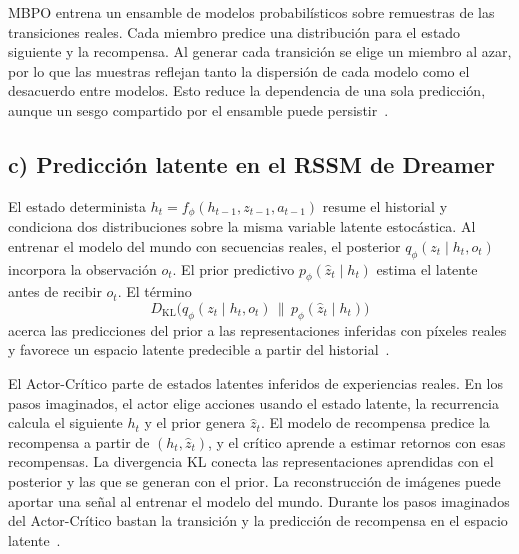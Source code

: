 MBPO entrena un ensamble de modelos probabilísticos sobre remuestras de
las transiciones reales. Cada miembro predice una distribución para el
estado siguiente y la recompensa. Al generar cada transición se elige
un miembro al azar, por lo que las muestras reflejan tanto la dispersión
de cada modelo como el desacuerdo entre modelos. Esto reduce la
dependencia de una sola predicción, aunque un sesgo compartido por el
ensamble puede persistir~\cite[secc.~5]{janner2019}.

\subsection*{c) Predicción latente en el RSSM de Dreamer}

El estado determinista $h_t=f_\phi(h_{t-1},z_{t-1},a_{t-1})$ resume el
historial y condiciona dos distribuciones sobre la misma variable
latente estocástica. Al entrenar el modelo del mundo con secuencias
reales, el posterior $q_\phi(z_t\mid h_t,o_t)$ incorpora la observación
$o_t$. El prior predictivo $p_\phi(\hat z_t\mid h_t)$ estima el latente
antes de recibir $o_t$. El término
\[
    D_{\mathrm{KL}}\bigl(
        q_\phi(z_t\mid h_t,o_t)\,\|\,p_\phi(\hat z_t\mid h_t)
    \bigr)
\]
acerca las predicciones del prior a las representaciones inferidas con
píxeles reales y favorece un espacio latente predecible a partir del
historial~\cite[secc.~4]{hafner2020}.

El Actor-Crítico parte de estados latentes inferidos de experiencias
reales. En los pasos imaginados, el actor elige acciones usando el
estado latente, la recurrencia calcula el siguiente $h_t$ y el prior
genera $\hat z_t$. El modelo de recompensa predice la recompensa a
partir de $(h_t,\hat z_t)$, y el crítico aprende a estimar retornos con
esas recompensas. La divergencia KL conecta las representaciones
aprendidas con el posterior y las que se generan con el prior. La
reconstrucción de imágenes puede aportar una señal al entrenar el
modelo del mundo. Durante los pasos imaginados del Actor-Crítico
bastan la transición y la predicción de recompensa en el espacio
latente~\cite[seccs.~3--4]{hafner2020}.
